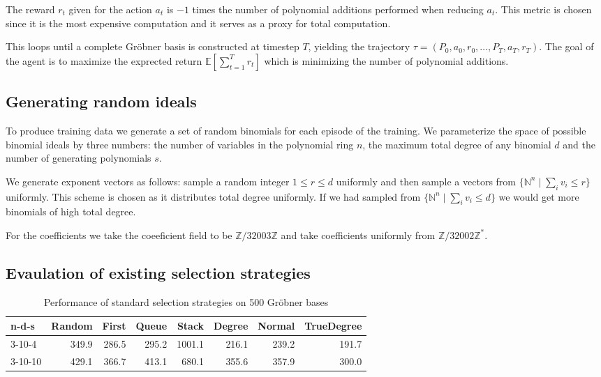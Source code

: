 \documentclass{article}
\theoremstyle{changedot}
\theoremstyle{changedotbreak}
\theoremstyle{nonumberplain}
\newcommand{\m}{\mathbb}
\begin{document}
The reward $r_{t}$ given for the action $a_{t}$ is $-1$ times the number of polynomial additions performed when reducing $a_{t}$. This metric is chosen since it is the most expensive computation and it serves as a proxy for total computation.

This loops until a complete Gröbner basis is constructed at timestep $T$, yielding the trajectory $\tau = (P_{0}, a_{0}, r_{0}, \dots, P_{T}, a_{T}, r_{T})$. The goal of the agent is to maximize the exprected return $\m E[\sum_{t=1}^{T} r_{t}]$ which is minimizing the number of polynomial additions.

\subsection{Generating random ideals}
To produce training data we generate a set of random binomials for each episode of the training. We parameterize the space of possible binomial ideals by three numbers: the number of variables in the polynomial ring $n$, the maximum total degree of any binomial $d$ and the number of generating polynomials $s$.

We generate exponent vectors as follows: sample a random integer $1 \leq r \leq d$ uniformly and then sample a vectors from $\{\m N^{n} \mid \sum_{i} v_{i} \leq r\}$ uniformly. This scheme is chosen as it distributes total degree uniformly. If we had sampled from $\{\m N^{n} \mid \sum_{i} v_{i} \leq d\}$ we would get more binomials of high total degree.

For the coefficients we take the coeeficient field to be $\m Z / 32003 \m Z$ and take coefficients uniformly from $\m Z / 32002\m Z ^{*}$. 

\subsection{Evaulation of existing selection strategies}
\begin{table}
  \begin{center}
  \begin{tabular}{lrrrrrrr}
    n-d-s   & Random & First & Queue & Stack  & Degree & Normal & TrueDegree \\ \hline
    3-10-4  & 349.9  & 286.5 & 295.2 & 1001.1 & 216.1  & 239.2  & 191.7 \\
    3-10-10 & 429.1  & 366.7 & 413.1 & 680.1  & 355.6  & 357.9  & 300.0
  \end{tabular}
  \end{center}
  \caption{Performance of standard selection strategies on 500 Gröbner bases}
  \label{tab:std_perf}
\end{table}
\end{document}

